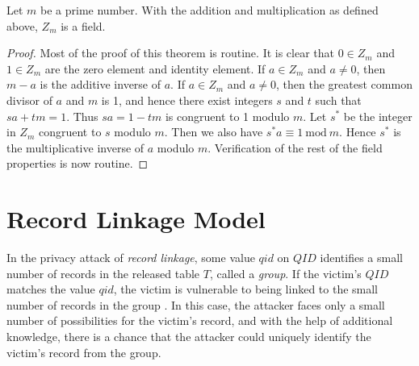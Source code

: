 \begin{theorem}\label{1th:Z_m}
Let $m$ be a prime number. With the addition and multiplication as 
defined above, $Z_m$ is a field.
\end{theorem}

\begin{proof}
Most of the proof of this theorem is routine.  It is clear that $0\in Z_m$ 
and $1\in Z_m$ are the 
zero element and identity element. If $a\in Z_m$ and $a\ne 0$, then $m-a$ 
is the additive inverse of $a$. If $a\in Z_m$ and $a\ne 0$, then the 
greatest common divisor of $a$ and $m$ is 1, and hence
there exist integers $s$ and $t$ such that $sa+tm=1$. Thus $sa=1 -tm$ is 
congruent to 1 modulo $m$. Let $s^*$ be the integer in $Z_m$ 
congruent to $s$ 
modulo $m$. Then we also have $s^*a\equiv 1\  \mbox{mod}\ m$. Hence $s^*$ 
is 
the multiplicative inverse of $a$ modulo $m$. Verification of the rest of 
the field properties is now routine.\end{proof}



\section{Record Linkage Model}\label{sec:reclinkage}

In the privacy attack of \emph{record linkage}, some value $qid$ on $QID$ identifies a small number of records in the released table $T$,
called a \emph{group}. If the victim's $QID$ matches the value
$qid$, the victim is vulnerable to being linked to the small
number of records in the group \cite{madden2005taq}. In this case, the attacker faces
only a small number of possibilities for the victim's record, and
with the help of additional knowledge, there is a chance that the
attacker could uniquely identify the victim's record from the
group.





